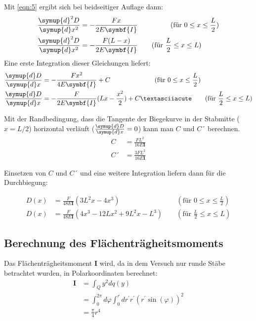 Mit \autoref{eqn:5} ergibt sich bei beidseitiger Auflage dann:
\begin{align}
    \frac{ \symup{d}^{ 2 }D }{ \symup{d}x^{ 2 } } &= - \frac{F x}{2 E \symbf{I}}  \qquad \qquad \; \; \,
    (\text{für } 0 \leq x \leq \frac{L}{2})\\
	\frac{ \symup{d}^{ 2 }D }{ \symup{d}x^{ 2 } } &= - \frac{F (L-x)}{2 E \symbf{I}} \qquad (\text{für } \frac{L}{2} \leq x \leq L)
\end{align}
Eine erste Integration dieser Gleichungen liefert:
\begin{align}
    \frac{ \symup{d}D }{ \symup{d}x } &= - \frac{F x^{2}}{4 E \symbf{I}} + C \qquad \qquad \qquad \; \; \,
    (\text{für } 0 \leq x \leq \frac{L}{2})\\
	\frac{ \symup{d}D }{ \symup{d}x } &= - \frac{F }{2 E \symbf{I}} (Lx - \frac{x^{2}}{2})+C´ \qquad (\text{für } \frac{L}{2} \leq x \leq L)
\end{align}

Mit der Randbedingung, dass die Tangente der Biegekurve in der Stabmitte ($x=L/2$) horizontal verläuft ($\frac{ \symup{d}D }{ \symup{d}x }=0$) kann man $C$ und $C´$ berechnen. 
\begin{align}
    C &= \frac{F L^{2}}{16 E \symbf{I}}  \\
    C´ &= \frac{3F L^{2}}{16 E \symbf{I}}  
    \label{eqn:c}
\end{align}

Einsetzen von $C$ und $C´$ und eine weitere Integration liefern dann für die Durchbiegung:

\begin{align}
    D(x) &= \frac{F}{48 E \symbf{I}} \left(3 L^2 x - 4 x^3 \right) 
    \qquad \qquad \qquad \qquad \: (\text{für } 0 \leq x \leq \frac{L}{2}) \\
    D(x) &= \frac{F}{48 E \symbf{I}} \left(4 x^3 - 12 L x^2 + 9 L^2 x - L^3 \right) 
    \qquad (\text{für } \frac{L}{2} \leq x \leq L)
    \label{eqn:beidseitig}
\end{align}


\subsection{Berechnung des Flächenträgheitsmoments}
\label{sec:flaechentraegheitsmoment}
Das Flächenträgheitsmoment $\mathbf{I}$ wird, da in dem Versuch nur runde Stäbe betrachtet wurden,
in Polarkoordinaten berechnet:
\begin{align}
	\mathbf{I} 
	&= \int_Q y^2 dq(y) 
	\\
	&= \int_0^{2\pi} d\varphi \int_0^r dr^\prime r^\prime 
	\left( r^\prime\sin(\varphi) \right)^2
	\\
	&= \frac{\pi}{4} r^4
\end{align}

